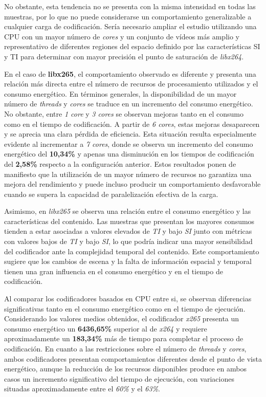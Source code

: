  No obstante, esta tendencia no se presenta con la misma intensidad en todas las muestras, por lo que no puede considerarse un comportamiento generalizable a cualquier carga de codificación. Sería necesario ampliar el estudio utilizando una CPU con un mayor número de \textit{cores} y un conjunto de vídeos más amplio y representativo de diferentes regiones del espacio definido por las características SI y TI para determinar con mayor precisión el punto de saturación de \textit{libx264}.

 En el caso de \textbf{libx265}, el comportamiento observado es diferente y presenta una relación más directa entre el número de recursos de procesamiento utilizados y el consumo energético. En términos generales, la disponibilidad de un mayor número de \textit{threads} y \textit{cores} se traduce en un incremento del consumo energético. No obstante, entre \textit{1 core} y \textit{3 cores} se observan mejoras tanto en el consumo como en el tiempo de codificación. A partir de \textit{6 cores}, estas mejoras desaparecen y se aprecia una clara pérdida de eficiencia. Esta situación resulta especialmente evidente al incrementar a \textit{7 cores}, donde se observa un incremento del consumo energético del \textbf{10,34\%} y apenas una disminución en los tiempos de codificación del \textbf{2,58\%} respecto a la configuración anterior. Estos resultados ponen de manifiesto que la utilización de un mayor número de recursos no garantiza una mejora del rendimiento y puede incluso producir un comportamiento desfavorable cuando se supera la capacidad de paralelización efectiva de la carga.

 Asimismo, en \textit{libx265} se observa una relación entre el consumo energético y las características del contenido. Las muestras que presentan los mayores consumos tienden a estar asociadas a valores elevados de \textit{TI} y bajo \textit{SI} junto con métricas con valores bajos de \textit{TI} y bajo \textit{SI}, lo que podría indicar una mayor sensibilidad del codificador ante la complejidad temporal del contenido. Este comportamiento sugiere que los cambios de escena y la falta de información espacial y temporal tienen una gran influencia en el consumo energético y en el tiempo de codificación.
 
 Al comparar los codificadores basados en CPU entre si, se observan diferencias significativas tanto en el consumo energético como en el tiempo de ejecución. Considerando los valores medios obtenidos, el codificador \textit{x265} presenta un consumo energético un \textbf{6436,65\%} superior al de \textit{x264} y requiere aproximadamente un \textbf{183,34\%} más de tiempo para completar el proceso de codificación. En cuanto a las restricciones sobre el número de \textit{threads} y \textit{cores}, ambos codificadores presentan comportamientos diferentes desde el punto de vista energético, aunque la reducción de los recursos disponibles produce en ambos casos un incremento significativo del tiempo de ejecución, con variaciones situadas aproximadamente entre el \textit{60\%} y el \textit{63\%}.


